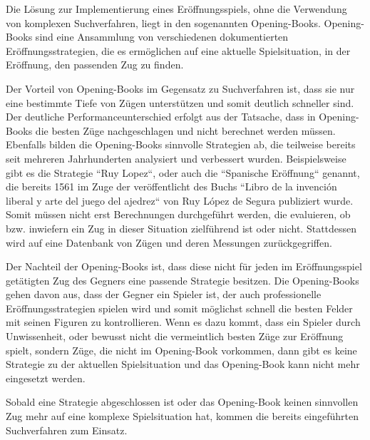 
Die Lösung zur Implementierung eines Eröffnungsspiels, ohne die Verwendung von komplexen Suchverfahren, liegt in den sogenannten Opening-Books. Opening-Books sind eine Ansammlung von verschiedenen dokumentierten Eröffnungsstrategien, die es ermöglichen auf eine aktuelle Spielsituation, in der Eröffnung, den passenden Zug zu finden.

Der Vorteil von Opening-Books im Gegensatz zu Suchverfahren ist, dass sie nur eine bestimmte Tiefe von Zügen unterstützen und somit deutlich schneller sind. Der deutliche Performanceunterschied erfolgt aus der Tatsache, dass in Opening-Books die besten Züge nachgeschlagen und nicht berechnet werden müssen. Ebenfalls bilden die Opening-Books sinnvolle Strategien ab, die teilweise bereits seit mehreren Jahrhunderten analysiert und verbessert wurden. Beispielsweise gibt es die Strategie ``Ruy Lopez``, oder auch die ``Spanische Eröffnung`` genannt, die bereits 1561 im Zuge der veröffentlicht des Buchs ``Libro de la invención liberal y arte del juego del ajedrez`` von Ruy López de Segura publiziert wurde. Somit müssen nicht erst Berechnungen durchgeführt werden, die evaluieren, ob bzw. inwiefern ein Zug in dieser Situation zielführend ist oder nicht. Stattdessen wird auf eine Datenbank von Zügen und deren Messungen zurückgegriffen.\cite{Chess.comTeamInternational2018}


Der Nachteil der Opening-Books ist, dass diese nicht für jeden im Eröffnungsspiel getätigten Zug des Gegners eine passende Strategie besitzen. Die Opening-Books gehen davon aus, dass der Gegner ein Spieler ist, der auch professionelle Eröffnungsstrategien spielen wird und somit möglichst schnell die besten Felder mit seinen Figuren zu kontrollieren. Wenn es dazu kommt, dass ein Spieler durch Unwissenheit, oder bewusst nicht die vermeintlich besten Züge zur Eröffnung spielt, sondern Züge, die nicht im Opening-Book vorkommen, dann gibt es keine Strategie zu der aktuellen Spielsituation und das Opening-Book kann nicht mehr eingesetzt werden. 

Sobald eine Strategie abgeschlossen ist oder das Opening-Book keinen sinnvollen Zug mehr auf eine komplexe Spielsituation hat, kommen die bereits eingeführten Suchverfahren zum Einsatz.


